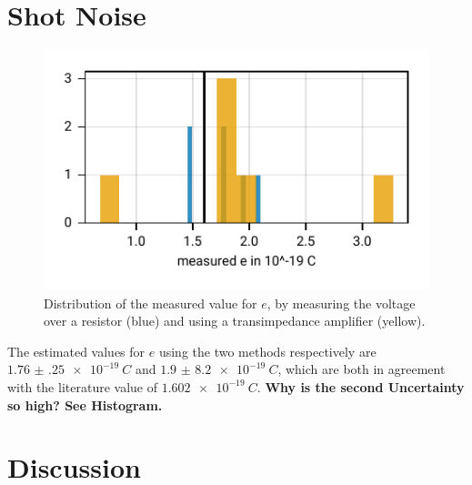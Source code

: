 \documentclass[
    parskip=half, 
    twoside=false,
    twocolumn=true,
    fontsize=11pt,
]{scrarticle}
\begin{document}
\section{Shot Noise}
\begin{figure}[h!]
    \centering
    \includegraphics{figures/03 shot noise.pdf}
    \caption{
        Distribution of the measured value for $e$, by measuring the voltage over a resistor (blue) and using a transimpedance amplifier (yellow).
    }
    \label{fig:shot noise}
\end{figure}
The estimated values for $e$ using the two methods respectively are $\SI{1.76(25)e-19}{C}$ and $\SI{1.9(82)e-19}{C}$, which are both in agreement with the literature value of $\SI{1.602e-19}{C}$.
\textbf{Why is the second Uncertainty so high? See Histogram.}

\pagebreak
\section{Discussion}

\nocite{*}
\printbibliography
\end{document}
